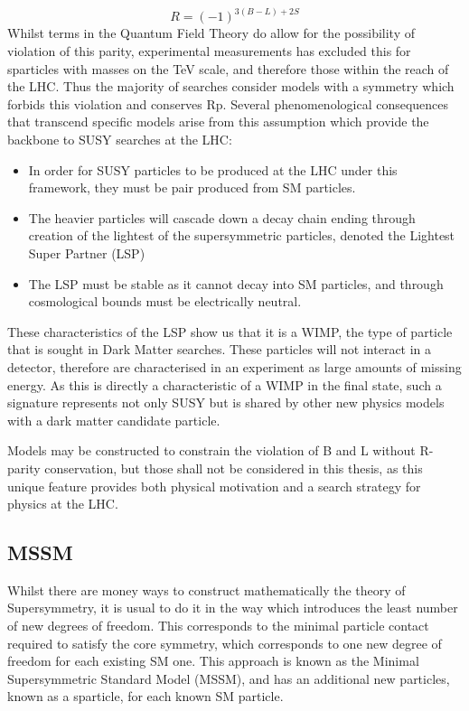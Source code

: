 \begin{equation}
R = (-1)^{3(B-L)+2S}
\label{eqn:RPAR}
\end{equation}
Whilst terms in the Quantum Field Theory do allow for the possibility of violation of this parity, experimental measurements has excluded this for sparticles with masses on the TeV scale, and therefore those within the reach of the LHC. Thus the  majority of searches consider models with a symmetry which forbids this violation and conserves Rp. Several phenomenological consequences that transcend specific models arise from this assumption which provide the backbone to SUSY searches at the LHC:

\begin{itemize}
\item{In order for SUSY particles to be produced at the LHC under this framework, they must be pair produced from SM particles.} 

\item{The heavier particles will cascade down a decay chain ending through creation of the lightest of the supersymmetric particles, denoted the Lightest Super Partner (LSP)}

\item{The LSP must be stable as it cannot decay into SM particles, and through cosmological bounds must be electrically neutral.} 
\end{itemize}
These characteristics of the LSP show us that it is a WIMP, the type of particle that is sought in Dark Matter searches.  These particles will not interact in a detector, therefore are characterised in an experiment as large amounts of missing energy. As this is directly a characteristic of a WIMP in the final state, such a signature represents not only SUSY but is shared by other new physics models with a dark matter candidate particle. 

Models may be constructed to constrain the violation of B and L without R-parity conservation, but those shall not be considered in this thesis, as this unique feature provides both physical motivation and a search strategy for physics at the LHC.


\subsection{MSSM} 

Whilst there are money ways to construct mathematically the theory of Supersymmetry, it is usual to do it in the way which introduces the least number of new degrees of freedom. This corresponds to the minimal particle contact required to satisfy the core symmetry, which corresponds to one new degree of freedom for each existing SM one. This approach is known as the Minimal Supersymmetric Standard Model (MSSM), and has an additional new particles, known as a sparticle, for each known SM particle. 

